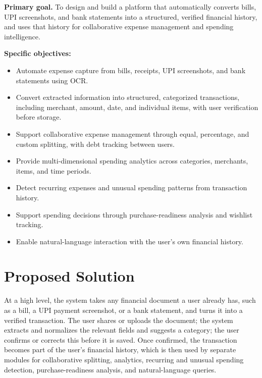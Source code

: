 \documentclass[11pt,a4paper]{article}
\begin{document}
\noindent\textbf{Primary goal.}
To design and build a platform that automatically converts bills, UPI
screenshots, and bank statements into a structured, verified financial
history, and uses that history for collaborative expense management and
spending intelligence.

\noindent\textbf{Specific objectives:}

\begin{itemize}

    \item Automate expense capture from bills, receipts, UPI
    screenshots, and bank statements using OCR.

    \item Convert extracted information into structured, categorized
    transactions, including merchant, amount, date, and individual
    items, with user verification before storage.

    \item Support collaborative expense management through equal,
    percentage, and custom splitting, with debt tracking between users.

    \item Provide multi-dimensional spending analytics across
    categories, merchants, items, and time periods.

    \item Detect recurring expenses and unusual spending patterns from
    transaction history.

    \item Support spending decisions through purchase-readiness
    analysis and wishlist tracking.

    \item Enable natural-language interaction with the user's own
    financial history.

\end{itemize}


\section{Proposed Solution}

At a high level, the system takes any financial document a user already
has, such as a bill, a UPI payment screenshot, or a bank statement, and
turns it into a verified transaction. The user shares or uploads the
document; the system extracts and normalizes the relevant fields and
suggests a category; the user confirms or corrects this before it is
saved. Once confirmed, the transaction becomes part of the user's
financial history, which is then used by separate modules for
collaborative splitting, analytics, recurring and unusual spending
detection, purchase-readiness analysis, and natural-language queries.
\end{document}

